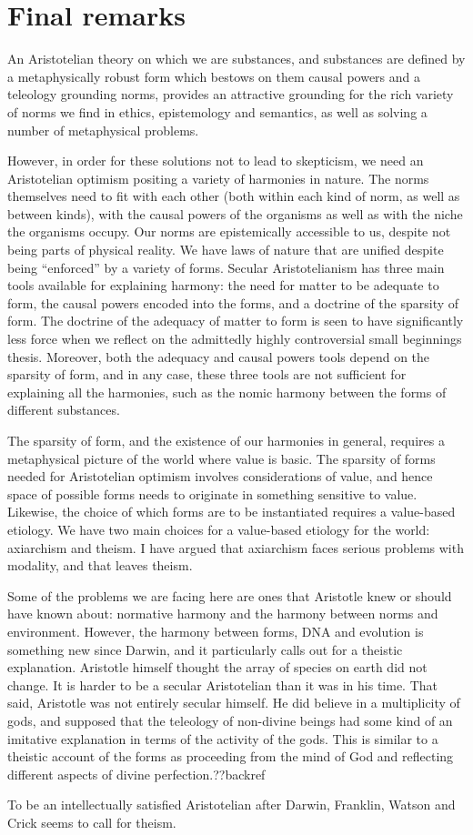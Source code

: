 \section{Final remarks}
An Aristotelian theory on which we are substances, and substances are defined by a metaphysically robust form which bestows
on them causal powers and a teleology grounding norms, provides an attractive grounding for the rich variety of norms we 
find in ethics, epistemology and semantics, as well as solving a number of metaphysical problems. 

However, in order for 
these solutions not to lead to skepticism, we need an Aristotelian optimism positing a variety of harmonies in nature. 
The norms themselves need to fit with each other (both within each 
kind of norm, as well as between kinds), with the causal powers of the organisms as well as with the niche the organisms 
occupy. Our norms are epistemically accessible to us, despite not being parts of physical reality. We have laws of nature that are unified
despite being ``enforced'' by a variety of forms. Secular Aristotelianism has three main tools available for explaining harmony: the need for matter to be adequate to form, the causal powers encoded into the forms, and a doctrine of the sparsity of form. The doctrine of the adequacy of matter to form is seen to have significantly less force when we reflect on the admittedly highly controversial small beginnings thesis. Moreover, both the adequacy and causal powers tools depend on the sparsity of form, and in any case, these three tools are not sufficient for explaining all the harmonies, such as the nomic harmony between the forms of different substances.

The sparsity of form, and the existence of our harmonies in general, requires a metaphysical picture of the world where value is basic. The sparsity of forms needed for Aristotelian optimism involves considerations of value, and hence space of possible forms needs to originate in something sensitive to value. Likewise, the choice of which forms are to be instantiated requires a value-based etiology. We have two main choices for a value-based etiology for the world: axiarchism and theism. I have argued that axiarchism faces serious problems with modality, and that leaves theism.

Some of the problems we are facing here are ones that Aristotle knew or should have known about: normative harmony and the harmony between norms and environment. However, the harmony between forms, DNA and evolution is something new since Darwin, and it particularly calls out for a theistic explanation. Aristotle himself thought the array of species on earth did not change. It is harder to be a secular Aristotelian than it was in his time. That said, Aristotle was not entirely secular himself. He did believe in a multiplicity of gods, and supposed that the teleology of non-divine beings had some kind of an imitative explanation in terms of the activity of the gods. This is similar to a theistic account of the forms as proceeding from the mind of God and reflecting different aspects of divine perfection.??backref

To be an intellectually satisfied Aristotelian after Darwin, Franklin, Watson and Crick seems to call for theism.

\chaptertail

